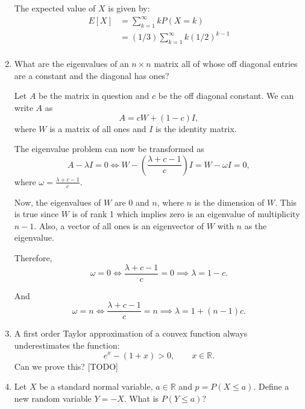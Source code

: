 \documentclass{amsart}
\theoremstyle{plain}
\numberwithin{equation}{section}
\begin{document}
\begin{enumerate}
The expected value of $X$ is given by:
\begin{align*}
E[X] &= \sum_{k=1}^{\infty} k P(X=k)\\
&= (1/3)\sum_{k=1}^{\infty} k (1/2)^{k-1}\\
\end{align*}

\item What are the eigenvalues of an $n \times n$ 
matrix all of whose off diagonal entries are 
a constant and the diagonal has ones?

Let $A$ be the matrix in question and 
$c$ be the off diagonal constant. We can write
$A$ as
\begin{equation}
A = cW + (1-c) I,
\end{equation}
where $W$ is a matrix of all ones and 
$I$ is the identity matrix. 

The eigenvalue problem can now be transformed as
\begin{equation}
A - \lambda I = 0 
\iff
W - \left(\frac{\lambda + c - 1}{c}\right) I  
= W - \omega I = 0,
\end{equation}
where $\omega = \frac{\lambda + c - 1}{c}$.

Now, the eigenvalues of $W$ are $0$ and $n$, where
$n$ is the dimension of $W$. This is true 
since $W$ is of rank 1 which implies zero is an 
eigenvalue of multiplicity $n-1$. Also, a vector of all ones 
is an eigenvector of $W$ with $n$ as the eigenvalue. 

Therefore, 
\begin{equation}
\omega = 0 \iff
\frac{\lambda + c - 1}{c} = 0
\implies \lambda = 1 - c.
\end{equation}

And
\begin{equation}
\omega = n \iff
\frac{\lambda + c - 1}{c} = n
\implies \lambda = 1 + (n-1)c.
\end{equation}


\item A first order Taylor approximation of a 
convex function always underestimates the
function:
\begin{equation}
e^{x} - ( 1 + x ) > 0, \qquad  x \in \mathbb{R}.
\end{equation}
Can we prove this? [TODO]

\item Let $X$ be a standard normal variable,
$a \in \mathbb{R}$ and $p = P( X \leq a )$.
Define a new random variable $Y = -X$. What is 
$P( Y \leq a )$?


\end{enumerate}
\end{document}
